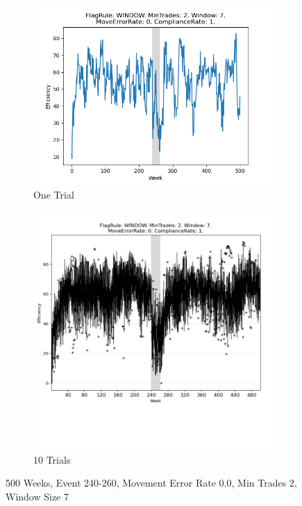 \documentclass{article}%
\begin{document}
%


\begin{figure}[!htb]%
\begin{subfigure}[b]{0.45\linewidth}%
\includegraphics[width=\linewidth]{2052fr_WINDOW_mt_2_ws_7_er_0_cr_1_t1.png}%
\caption{One Trial}%
\end{subfigure}%
\begin{subfigure}[b]{0.45\linewidth}%
\includegraphics[clip,width=\linewidth,trim=0 4cm 0 0]{2052fr_WINDOW_mt_2_ws_7_er_0_cr_1_t10.png}%
\caption{10 Trials}%
\end{subfigure}%
\caption{500 Weeks, Event 240{-}260, Movement Error Rate 0.0, Min Trades 2, Window Size 7}%
\end{figure}
\end{document}
